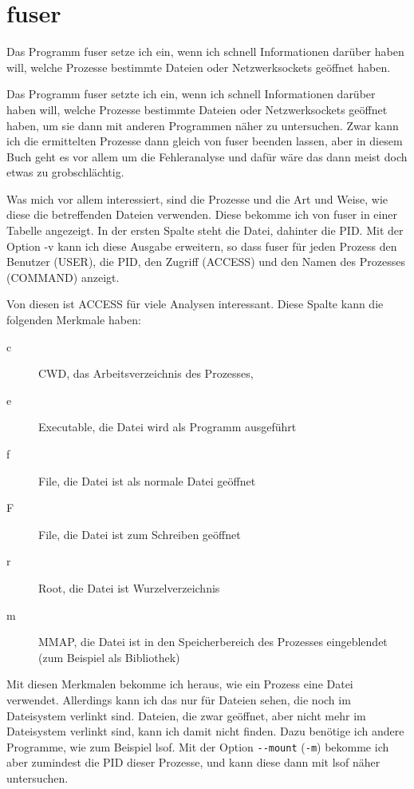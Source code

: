 \section{fuser}
\label{sec:lokal-werkzeuge-fuser}
\begin{abstractsec}
  Das Programm fuser setze ich ein, wenn ich schnell Informationen darüber
  haben will, welche Prozesse bestimmte Dateien oder Netzwerksockets geöffnet
  haben.
\end{abstractsec}
\begin{normaltext}
  Das Programm fuser setzte ich ein, wenn ich schnell Informationen darüber
  haben will, welche Prozesse bestimmte Dateien oder Netzwerksockets geöffnet
  haben, um sie dann mit anderen Programmen näher zu untersuchen.
  Zwar kann ich die ermittelten Prozesse dann gleich von fuser beenden lassen,
  aber in diesem Buch geht es vor allem um die Fehleranalyse und dafür wäre
  das dann meist doch etwas zu grobschlächtig.

  Was mich vor allem interessiert, sind die Prozesse und die Art und Weise,
  wie diese die betreffenden Dateien verwenden.
  Diese bekomme ich von fuser in einer Tabelle angezeigt. In der ersten Spalte
  steht die Datei, dahinter die PID. Mit der Option -v kann ich diese Ausgabe
  erweitern, so dass fuser für jeden Prozess den Benutzer (USER), die PID, den
  Zugriff (ACCESS) und den Namen des Prozesses (COMMAND) anzeigt.

  Von diesen ist ACCESS für viele Analysen interessant. Diese Spalte kann die
  folgenden Merkmale haben:
  \begin{description}
    \item[c] CWD, das Arbeitsverzeichnis des Prozesses,
    \item[e] Executable, die Datei wird als Programm ausgeführt
    \item[f] File, die Datei ist als normale Datei geöffnet
    \item[F] File, die Datei ist zum Schreiben geöffnet
    \item[r] Root, die Datei ist Wurzelverzeichnis
    \item[m] MMAP, die Datei ist in den Speicherbereich des Prozesses
      eingeblendet (zum Beispiel als Bibliothek)
  \end{description}
  Mit diesen Merkmalen bekomme ich heraus, wie ein Prozess eine Datei
  verwendet. Allerdings kann ich das nur für Dateien sehen, die noch im
  Dateisystem verlinkt sind. Dateien, die zwar geöffnet, aber nicht mehr im
  Dateisystem verlinkt sind, kann ich damit nicht finden. Dazu benötige ich
  andere Programme, wie zum Beispiel lsof. Mit der Option \verb?--mount?
  (\verb?-m?) bekomme ich aber zumindest die PID dieser Prozesse, und kann
  diese dann mit lsof näher untersuchen.


\end{normaltext}
